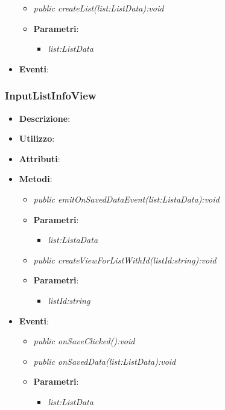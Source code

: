 \begin{itemize}
\begin{itemize}
	\item \textit{public createList(list:ListData):void}\\

			\item{\textbf{Parametri}: \begin{itemize}
			\item \textit{list:ListData}\\

			\end{itemize}}
	\end{itemize}
\item \textbf{Eventi}:
\end{itemize}

\subsubsection{InputListInfoView}
\begin{itemize}
\item \textbf{Descrizione}: 
\item \textbf{Utilizzo}:
\item \textbf{Attributi}: 
\item \textbf{Metodi}:
	\begin{itemize}	
	\item \textit{public emitOnSavedDataEvent(list:ListaData):void}\\

			\item{\textbf{Parametri}: \begin{itemize}
			\item \textit{list:ListaData}\\

			\end{itemize}}
	\item \textit{public createViewForListWithId(listId:string):void}\\

			\item{\textbf{Parametri}: \begin{itemize}
			\item \textit{listId:string}\\

			\end{itemize}}
	\end{itemize}
\item \textbf{Eventi}:
	\begin{itemize}
	\item \textit{public onSaveClicked():void}\\
	
	\item \textit{public onSavedData(list:ListData):void}\\

			\item{\textbf{Parametri}: \begin{itemize}
			\item \textit{list:ListData}\\

			\end{itemize}}
	\end{itemize}
\end{itemize}

